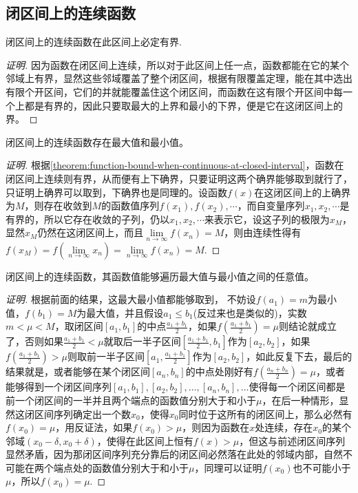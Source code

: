 \subsection{闭区间上的连续函数}
\label{sec:continuous-function-in-closed-interval}

\begin{theorem}
  \label{theorem:function-bound-when-continuous-at-closed-interval}
  闭区间上的连续函数在此区间上必定有界.
\end{theorem}

\begin{proof}[证明]
  因为函数在闭区间上连续，所以对于此区间上任一点，函数都能在它的某个邻域上有界，显然这些邻域覆盖了整个闭区间，根据有限覆盖定理，能在其中选出有限个开区间，它们的并就能覆盖住这个闭区间，而函数在这有限个开区间中每一个上都是有界的，因此只要取最大的上界和最小的下界，便是它在这闭区间上的界。
\end{proof}

\begin{theorem}
  闭区间上的连续函数存在最大值和最小值。
\end{theorem}

\begin{proof}[证明]
  根据\autoref{theorem:function-bound-when-continuous-at-closed-interval}，函数在闭区间上连续则有界，从而便有上下确界，只要证明这两个确界能够取到就行了，只证明上确界可以取到，下确界也是同理的。设函数$f(x)$在这闭区间上的上确界为$M$，则存在收敛到$M$的函数值序列$f(x_1),f(x_2),\cdots$，而自变量序列$x_1,x_2,\cdots$是有界的，所以它存在收敛的子列，仍以$x_1,x_2,\cdots$来表示它，设这子列的极限为$x_M$，显然$x_M$仍然在这闭区间上，而且$\lim\limits_{n \to \infty}f(x_n)=M$，则由连续性得有$f(x_M)=f(\lim\limits_{n \to \infty} x_n) = \lim\limits_{n \to \infty} f(x_n) = M$.
\end{proof}

\begin{theorem}[介值定理]
  闭区间上的连续函数，其函数值能够遍历最大值与最小值之间的任意值。
\end{theorem}

\begin{proof}[证明]
  根据前面的结果，这最大最小值都能够取到， 不妨设$f(a_1)=m$为最小值，$f(b_1)=M$为最大值，并且假设$a_1 \leqslant b_1$(反过来也是类似的)，实数$m < \mu < M$，取闭区间$[a_1,b_1]$的中点$\frac{a_1+b_1}{2}$，如果$f(\frac{a_1+b_1}{2})=\mu$则结论就成立了，否则如果$\frac{a_1+b_1}{2} < \mu$就取后一半子区间$[\frac{a_1+b_1}{2}, b_1]$作为$[a_2,b_2]$，如果$f(\frac{a_1+b_1}{2})>\mu$则取前一半子区间$[a_1,\frac{a_1+b_1}{2}]$作为$[a_2,b_2]$，如此反复下去，最后的结果就是，或者能够在某个闭区间$[a_n,b_n]$的中点处刚好有$f(\frac{a_n+b_n}{2})=\mu$，或者能够得到一个闭区间序列$[a_1,b_1],[a_2,b_2],\ldots,[a_n,b_n],\ldots$使得每一个闭区间都是前一个闭区间的一半并且两个端点的函数值分别大于和小于$\mu$，在后一种情形，显然这闭区间序列确定出一个数$x_0$，使得$x_0$同时位于这所有的闭区间上，那么必然有$f(x_0)=\mu$，用反证法，如果$f(x_0)>\mu$，则因为函数在$x$处连续，存在$x_0$的某个邻域$(x_0-\delta,x_0+\delta)$，使得在此区间上恒有$f(x)>\mu$，但这与前述闭区间序列显然矛盾，因为那闭区间序列充分靠后的闭区间必然落在此处的邻域内部，自然不可能在两个端点处的函数值分别大于和小于$\mu$，同理可以证明$f(x_0)$也不可能小于$\mu$，所以$f(x_0)=\mu$.
\end{proof}

